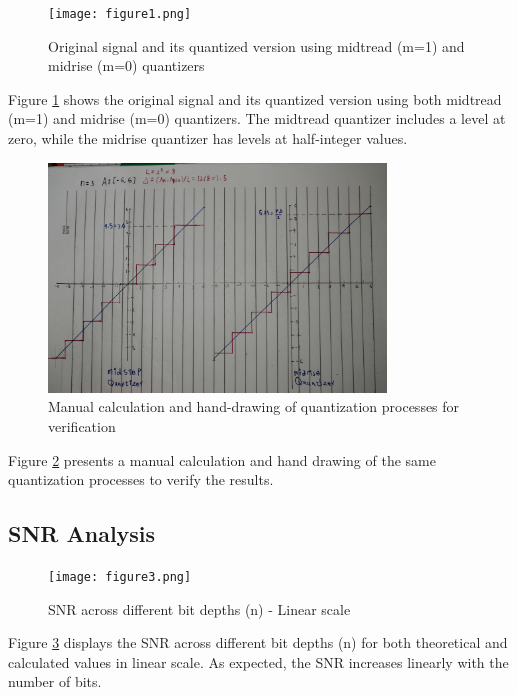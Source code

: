 \documentclass{article}
\begin{document}
\begin{figure}[H]
    \centering
    \texttt{[image: figure1.png]}
    \caption{Original signal and its quantized version using midtread (m=1) and midrise (m=0) quantizers}
    \label{fig:midtread_midrise}
\end{figure}

Figure \ref{fig:midtread_midrise} shows the original signal and its quantized version using both midtread (m=1) and midrise (m=0) quantizers. The midtread quantizer includes a level at zero, while the midrise quantizer has levels at half-integer values.

\begin{figure}[H]
    \centering
    \includegraphics[width=0.8\textwidth]{figure-2.jpg}
    \caption{Manual calculation and hand-drawing of quantization processes for verification}
    \label{fig:manual_calc}
\end{figure}

Figure \ref{fig:manual_calc} presents a manual calculation and hand drawing of the same quantization processes to verify the results.

\subsection{SNR Analysis}

\begin{figure}[H]
    \centering
    \texttt{[image: figure3.png]}
    \caption{SNR across different bit depths (n) - Linear scale}
    \label{fig:snr_linear}
\end{figure}

Figure \ref{fig:snr_linear} displays the SNR across different bit depths (n) for both theoretical and calculated values in linear scale. As expected, the SNR increases linearly with the number of bits.
\end{document}
